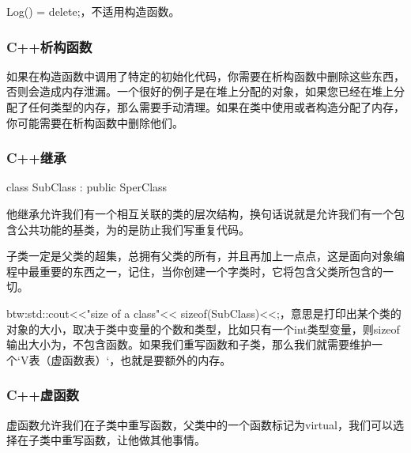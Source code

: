 {\ncodestyle Log() = delete;}，不适用构造函数。

\subsubsection{C++析构函数}

如果在构造函数中调用了特定的初始化代码，你需要在析构函数中删除这些东西，否则会造成内存泄漏。一个很好的例子是在堆上分配的对象，如果您已经在堆上分配了任何类型的内存，那么需要手动清理。如果在类中使用或者构造分配了内存，你可能需要在析构函数中删除他们。

\subsubsection{C++继承}

{\ncodestyle class SubClass : public SperClass}

他继承允许我们有一个相互关联的类的层次结构，换句话说就是允许我们有一个包含公共功能的基类，为的是防止我们写重复代码。

子类一定是父类的超集，总拥有父类的所有，并且再加上一点点，这是面向对象编程中最重要的东西之一，记住，当你创建一个字类时，它将包含父类所包含的一切。

btw:{\ncodestyle std::cout<<"size of a class"<< sizeof(SubClass)<<;}，意思是打印出某个类的对象的大小，取决于类中变量的个数和类型，比如只有一个{\ncodestyle int}类型变量，则{\ncodestyle sizeof}输出大小为{}，不包含函数。如果我们重写函数和子类，那么我们就需要维护一个`V表（虚函数表）`，也就是要额外的内存。

\subsubsection{C++虚函数}

虚函数允许我们在子类中重写函数，父类中的一个函数标记为{\ncodestyle virtual}，我们可以选择在子类中重写函数，让他做其他事情。


